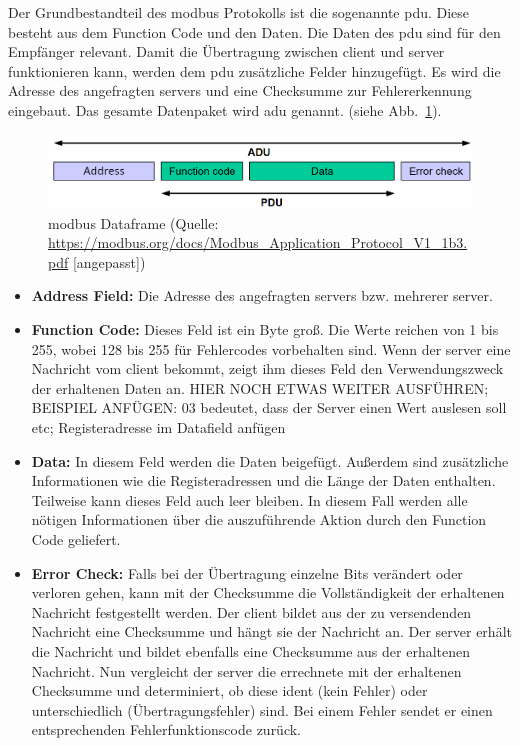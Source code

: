 Der Grundbestandteil des \gls{modbus} Protokolls ist die sogenannte \acf{pdu}. Diese besteht aus dem Function Code und den Daten. Die Daten des \acs{pdu} sind für den Empfänger relevant. Damit die Übertragung zwischen \gls{client} und \gls{server} funktionieren kann, werden dem \acs{pdu} zusätzliche Felder hinzugefügt. Es wird die Adresse des angefragten \gls{server}s und eine Checksumme zur Fehlererkennung eingebaut. Das gesamte Datenpaket wird \acf{adu} genannt.
(siehe Abb.~\ref{fig:modbus_adu_pdu}).
\begin{figure}[H]
	\centering
	\includegraphics[width=1.0\linewidth]{Bilder/General_Modbus_Frame_Changed}
	\caption{\gls{modbus} Dataframe (Quelle: \url{https://modbus.org/docs/Modbus_Application_Protocol_V1_1b3.pdf} [angepasst])}
	\label{fig:modbus_adu_pdu}
\end{figure}

\begin{itemize}
	\item \textbf{Address Field:} Die Adresse des angefragten \gls{server}s bzw. mehrerer \gls{server}. 
	\item \textbf{Function Code:} Dieses Feld ist ein Byte groß. Die Werte reichen von 1 bis 255, wobei 128 bis 255 für Fehlercodes vorbehalten sind. Wenn der \gls{server} eine Nachricht vom \gls{client} bekommt, zeigt ihm dieses Feld den Verwendungszweck der erhaltenen Daten an. HIER NOCH ETWAS WEITER AUSFÜHREN; BEISPIEL ANFÜGEN: 03 bedeutet, dass der Server einen Wert auslesen soll etc; Registeradresse im Datafield anfügen
	\item \textbf{Data:} In diesem Feld werden die Daten beigefügt. Außerdem sind zusätzliche Informationen wie die Registeradressen und die Länge der Daten enthalten. Teilweise kann dieses Feld auch leer bleiben. In diesem Fall werden alle nötigen Informationen über die auszuführende Aktion durch den Function Code geliefert. 
	\item \textbf{Error Check:} Falls bei der Übertragung einzelne Bits verändert oder verloren gehen, kann mit der Checksumme die Vollständigkeit der erhaltenen Nachricht festgestellt werden. Der \gls{client} bildet aus der zu versendenden Nachricht eine Checksumme und hängt sie der Nachricht an. Der \gls{server} erhält die Nachricht und bildet ebenfalls eine Checksumme aus der erhaltenen Nachricht. Nun vergleicht der \gls{server} die errechnete mit der erhaltenen Checksumme und determiniert, ob diese ident (kein Fehler) oder unterschiedlich (Übertragungsfehler) sind. Bei einem Fehler sendet er einen entsprechenden Fehlerfunktionscode zurück.
\end{itemize}

